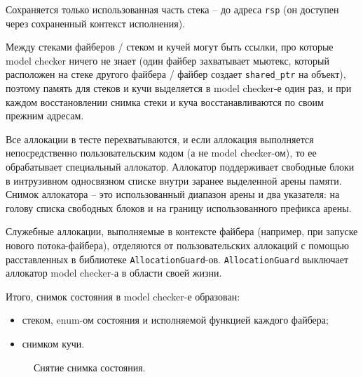Сохраняется только использованная часть стека – до адреса \texttt{rsp} (он доступен через сохраненный контекст исполнения).

Между стеками файберов / стеком и кучей могут быть ссылки, про которые model checker ничего не знает (один файбер захватывает мьютекс, который расположен на стеке другого файбера / файбер создает \texttt{shared_ptr} на объект), поэтому память для стеков и кучи выделяется в model checker-е один раз, и при каждом восстановлении снимка стеки и куча восстанавливаются по своим прежним адресам. 

Все аллокации в тесте перехватываются, и если аллокация выполняется непосредственно пользовательским кодом (а не model checker-ом), то ее обрабатывает специальный аллокатор. Аллокатор поддерживает свободные блоки в интрузивном односвязном списке внутри заранее выделенной арены памяти. Снимок аллокатора – это использованный диапазон арены и два указателя: на голову списка свободных блоков и на границу использованного префикса арены.

Служебные аллокации, выполняемые в контексте файбера (например, при запуске нового потока-файбера), отделяются от пользовательских аллокаций с помощью расставленных в библиотеке \texttt{AllocationGuard}-ов. \texttt{AllocationGuard} выключает аллокатор model checker-а в области своей жизни.

Итого, снимок состояния в model checker-е образован:

\begin{itemize}
\item	стеком, enum-ом состояния и исполняемой функцией каждого файбера;

\item	снимком кучи.
\end{itemize}

\begin{figure}
	\bigskip
	\caption{Снятие снимка состояния.}
\end{figure}

